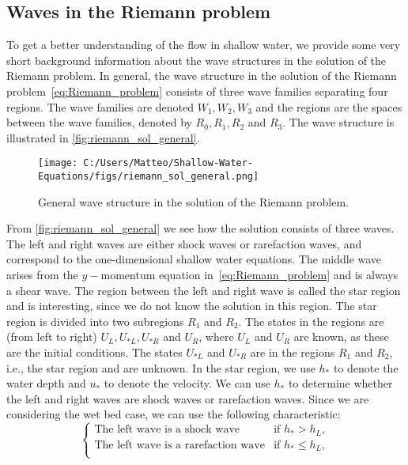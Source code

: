 \subsection{Waves in the Riemann problem}
To get a better understanding of the flow in shallow water, we provide some very short background information about the wave structures in the solution of the Riemann problem.
In general, the wave structure in the solution of the Riemann problem~\eqref{eq:Riemann_problem} consists of three wave families separating four regions.
The wave families are denoted $W_1, W_2, W_3$ and the regions are the spaces between the wave families, denoted by $R_0, R_1, R_2$ and $R_3$.
The wave structure is illustrated in \autoref{fig:riemann_sol_general}.
\begin{figure}[H]
    \centering
    \texttt{[image: C:/Users/Matteo/Shallow-Water-Equations/figs/riemann\_sol\_general.png]}
    \caption{General wave structure in the solution of the Riemann problem.}\label{fig:riemann_sol_general}
\end{figure}
From \autoref{fig:riemann_sol_general} we see how the solution consists of three waves.
The left and right waves are either shock waves or rarefaction waves, and correspond to the one-dimensional shallow water equations.
The middle wave arises from the $y-$momentum equation in~\eqref{eq:Riemann_problem} and is always a shear wave.
The region between the left and right wave is called the star region and is interesting, since we do not know the solution in this region.
The star region is divided into two subregions $R_1$ and $R_2$.
The states in the regions are (from left to right) $U_L, U_{*L}, U_{*R}$ and $U_R$, where $U_L$ and $U_R$ are known, as these are the initial conditions.
The states $U_{*L}$ and $U_{*R}$ are in the regions $R_1$ and $R_2$, i.e., the star region and are unknown.
In the star region, we use $h_*$ to denote the water depth and $u_*$ to denote the velocity.
We can use $h_*$ to determine whether the left and right waves are shock waves or rarefaction waves.
Since we are considering the wet bed case, we can use the following characteristic:
\begin{equation*}
    \begin{cases}
        \text{The left wave is a shock wave} & \text{if } h_* > h_L, \\
        \text{The left wave is a rarefaction wave} & \text{if } h_* \leq h_L, \\        
    \end{cases} 
\end{equation*}
